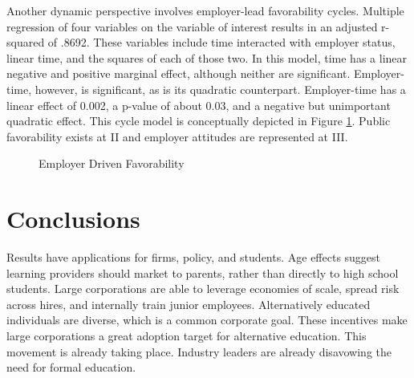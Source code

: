 \documentclass[AER]{./aea-latex-templates/AEA}
\begin{document}
        Another dynamic perspective involves employer-lead favorability cycles.
        Multiple regression of four variables on the variable of interest results in an adjusted r-squared of .8692.
        These variables include time interacted with employer status, linear time, and the squares of each of
        those two.
        In this model, time has a linear negative and positive marginal effect, although neither are significant.
        Employer-time, however, is significant, as is its quadratic counterpart.
        Employer-time has a linear effect of 0.002, a p-value of about 0.03, and a negative but unimportant
        quadratic effect.
        This cycle model is conceptually depicted in Figure \ref{fig:employer_driven_favorability}.
        Public favorability exists at II and employer attitudes are represented at III.
        
        \begin{figure}[h!]
            \centering
            \caption{Employer Driven Favorability}
        

            \label{fig:employer_driven_favorability}
            \end{figure}

        \section{Conclusions}
        
        Results have applications for firms, policy, and students.
        Age effects suggest learning providers should market to parents,
        rather than directly to high school students.
        Large corporations are able to leverage economies of scale, spread risk across hires,
        and internally train junior employees.
        Alternatively educated individuals are diverse\cite{florentine_2018}, which is a common corporate goal.
        These incentives make large corporations a great adoption target for alternative education.
        This movement is already taking place. Industry leaders are already disavowing the need for formal education\cite{glassdoor_2018}.
\end{document}
